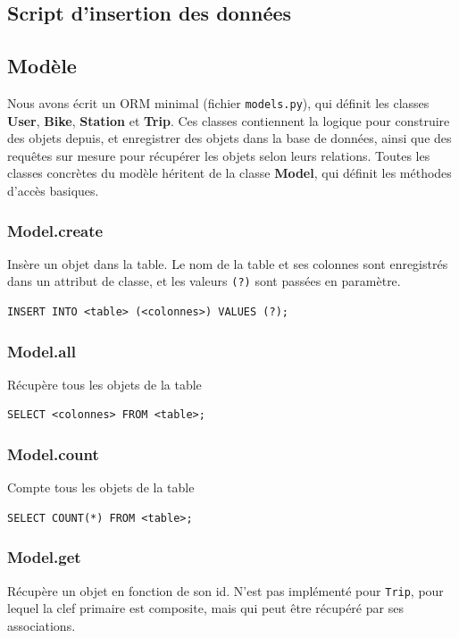 \documentclass[a4paper,10pt]{article}
\begin{document}
\subsection{Script d'insertion des données}

\subsection{Modèle}
Nous avons écrit un ORM minimal (fichier \texttt{models.py}), qui définit les classes
\textbf{User}, \textbf{Bike}, \textbf{Station} et \textbf{Trip}. Ces classes contiennent
la logique pour construire des objets depuis, et enregistrer des objets dans la base
de données, ainsi que des requêtes sur mesure pour récupérer les objets selon leurs
relations. Toutes les classes concrètes du modèle héritent de la classe \textbf{Model}, qui
définit les méthodes d'accès basiques.

\subsubsection{Model.create}
Insère un objet dans la table. Le nom de la table et ses colonnes sont enregistrés
dans un attribut de classe, et les valeurs \texttt{(?)} sont passées en paramètre.

\begin{lstlisting}
INSERT INTO <table> (<colonnes>) VALUES (?);
\end{lstlisting}

\subsubsection{Model.all}
Récupère tous les objets de la table

\begin{lstlisting}
SELECT <colonnes> FROM <table>;
\end{lstlisting}

\subsubsection{Model.count}
Compte tous les objets de la table

\begin{lstlisting}
SELECT COUNT(*) FROM <table>;
\end{lstlisting}

\subsubsection{Model.get}
Récupère un objet en fonction de son id. N'est pas implémenté pour \texttt{Trip},
pour lequel la clef primaire est composite, mais qui peut être récupéré par ses
associations.
\end{document}

